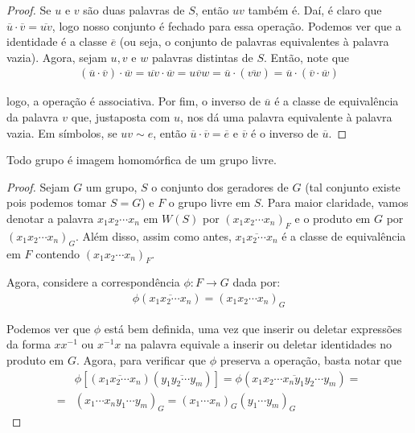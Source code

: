 	\begin{proof}
		Se $u$ e $v$ são duas palavras de $S$, então $uv$ também é. Daí, é claro que
		$\overline{u}\cdot\overline{v} = \overline{uv}$, logo nosso conjunto é fechado para essa operação. 
		Podemos ver que a identidade é a classe $\overline{e}$ (ou seja, o conjunto de palavras equivalentes
		à palavra vazia). Agora, sejam $u,v$ e $w$ palavras distintas de $S$. Então, note que
		\begin{align*}
		    (\overline{u}\cdot\overline{v})\cdot\overline{w} 
		    = \overline{uv}\cdot\overline{w} 
		    = \overline{uvw} 
		    = \overline{u}\cdot (\overline{vw}) 
		    = \overline{u}\cdot (\overline{v}\cdot\overline{w})
		\end{align*}
		\par\vspace{0.3cm} logo, a operação é associativa. Por fim, o inverso de $\overline{u}$ é 
		a classe de equivalência da palavra $v$ que, justaposta com $u$, nos dá uma palavra equivalente 
		à palavra vazia. Em símbolos, se $uv\sim e$, então $\overline{u}\cdot\overline{v} = \overline{e}$ 
		e $\overline{v}$ é o inverso de $\overline{u}$.
	\end{proof}
	\begin{theorem}
	\label{mapeamento universal}
		Todo grupo é imagem homomórfica de um grupo livre.
	\end{theorem}
	\begin{proof}
		Sejam $G$ um grupo, $S$ o conjunto dos geradores de $G$ (tal conjunto existe pois podemos tomar $S = G$) 
		e $F$ o grupo livre em $S$. Para maior claridade, vamos denotar a palavra $x_1x_2\cdots x_n$ 
		em $W(S)$ por $(x_1x_2\cdots x_n)_F$ e o produto em $G$ por $(x_1x_2\cdots x_n)_G$. Além disso, 
		assim como antes, $\overline{x_1x_2\cdots x_n}$ é a classe de equivalência em $F$ contendo 
		$(x_1x_2\cdots x_n)_F$.
		
		\par\vspace{0.3cm} Agora, considere a correspondência $\phi: F\to G$ dada por: 
		\begin{align*}
		    \phi(\overline{x_1x_2\cdots x_n}) = (x_1x_2\cdots x_n)_G
		\end{align*}
		\par\vspace{0.3cm} Podemos ver que $\phi$ está bem definida, uma vez que inserir ou deletar 
		expressões da forma $xx^{-1}$ ou $x^{-1}x$ na palavra equivale a inserir ou deletar identidades 
		no produto em $G$. Agora, para verificar que $\phi$ preserva a operação, basta notar que
		\begin{align*}
		    &\phi[(\overline{x_1x_2\cdots x_n})(\overline{y_1y_2\cdots y_m})] 
		    = \phi(\overline{x_1x_2\cdots x_ny_1y_2\cdots y_m}) = \\ 
		    = &(x_1\cdots x_ny_1\cdots y_m)_G = (x_1\cdots x_n)_G(y_1\cdots y_m)_G
		\end{align*}
	\end{proof}
